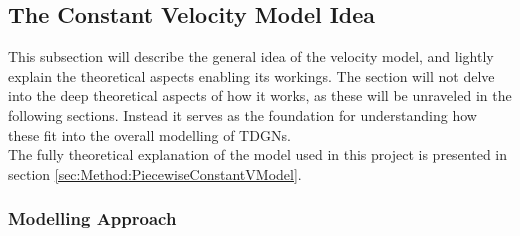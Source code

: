 \subsection{The Constant Velocity Model Idea}
\label{sec:Method:VModel}
This subsection will describe the general idea of the velocity model, and lightly explain the theoretical aspects enabling its workings.
The section will not delve into the deep theoretical aspects of how it works, as these will be unraveled in the following sections.
Instead it serves as the foundation for understanding how these fit into the overall modelling of TDGNs.
\\
The fully theoretical explanation of the model used in this project is presented in section \ref{sec:Method:PiecewiseConstantVModel}.



\subsubsection{Modelling Approach}
\label{sec:Method:VModel:ModellingApproach}

